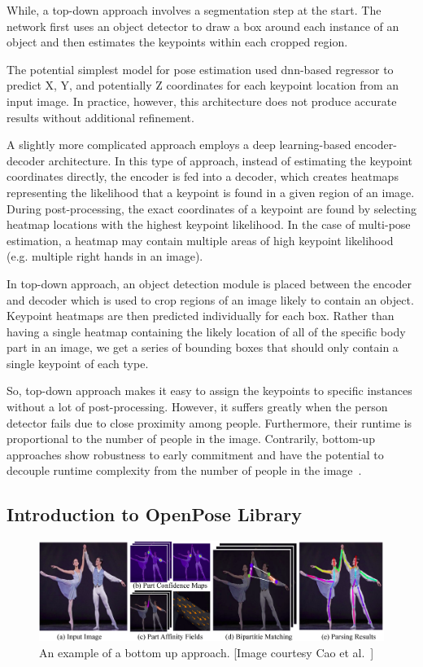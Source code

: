 While, a top-down approach involves a segmentation step at the start. The network first uses an object detector to draw a box around each instance of an object and then estimates the keypoints within each cropped region. 

The potential simplest model for pose estimation used \gls{dnn}-based regressor to predict X, Y, and potentially Z coordinates for each keypoint location from an input image. In practice, however, this architecture does not produce accurate results without additional refinement. 

A slightly more complicated approach employs a deep learning-based encoder-decoder architecture. In this type of approach, instead of estimating the keypoint coordinates directly, the encoder is fed into a decoder, which creates heatmaps representing the likelihood that a keypoint is found in a given region of an image. During post-processing, the exact coordinates of a keypoint are found by selecting heatmap locations with the highest keypoint likelihood. In the case of multi-pose estimation, a heatmap may contain multiple areas of high keypoint likelihood (e.g. multiple right hands in an image). 

In top-down approach, an object detection module is placed between the encoder and decoder which is used to crop regions of an image likely to contain an object. Keypoint heatmaps are then predicted individually for each box. Rather than having a single heatmap containing the likely location of all of the specific body part in an image, we get a series of bounding boxes that should only contain a single keypoint of each type. 

So, top-down approach makes it easy to assign the keypoints to specific instances without a lot of post-processing. However, it suffers greatly when the person detector fails due to close proximity among people. Furthermore, their runtime is proportional to the number of people in the image. Contrarily, bottom-up approaches show robustness to early commitment and have the potential to decouple runtime complexity from the number of people in the image~\cite{Cao_19}.



\subsection{Introduction to OpenPose Library} 
\begin{figure}
	\centering
	\includegraphics[width=\textwidth]{figures/openpose_bottom_up.eps}
	\caption[An example of a bottom up approach]
	{An example of a bottom up approach. [Image courtesy Cao et al.~\cite{Cao_19}] \label{fig:openpose_bottom_up}}
\end{figure}

